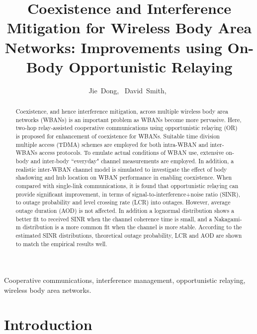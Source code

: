 \documentclass[12pt,draftcls,a4paper,onecolumn,journal]{IEEEtran}
\begin{document}
\title{Coexistence and Interference Mitigation for Wireless Body Area Networks: Improvements using On-Body Opportunistic Relaying}


\author{Jie~Dong,~
        David~Smith,~
}

\maketitle

\begin{abstract}
   Coexistence, and hence interference mitigation, across multiple wireless body area networks (WBANs) is an important problem as WBANs become more pervasive. Here, two-hop relay-assisted cooperative communications using opportunistic relaying (OR) is proposed for enhancement of coexistence for WBANs. Suitable time division multiple access (TDMA) schemes are employed for both intra-WBAN and inter-WBANs access protocols. To emulate actual conditions of WBAN use, extensive on-body and inter-body ``everyday" channel measurements are employed. In addition, a realistic inter-WBAN channel model is simulated to investigate the effect of body shadowing and hub location on WBAN performance in enabling coexistence. When compared with single-link communications, it is found that opportunistic relaying can provide significant improvement, in terms of signal-to-interference+noise ratio (SINR), to outage probability and level crossing rate (LCR) into outages. However, average outage duration (AOD) is not affected. In addition a lognormal distribution shows a better fit to received SINR when the channel coherence time is small, and a Nakagami-m distribution is a more common fit when the channel is more stable. According to the estimated SINR distributions, theoretical outage probability, LCR and AOD are shown to match the empirical results well.\end{abstract}


\begin{IEEEkeywords}
Cooperative communications, interference management, opportunistic relaying, wireless body area networks.
\end{IEEEkeywords}


\newpage
\section{Introduction}
\end{document}
